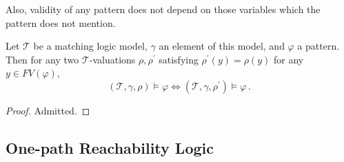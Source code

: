 \documentclass{article}
\begin{document}
Also, validity of any pattern does not depend on those variables which the pattern does not mention.
\begin{lemma}\label{lem:unusedVariables}
    Let $\mathcal{T}$ be a matching logic model, $\gamma$ an element of this model,
    and $\varphi$ a pattern.
    Then for any two $\mathcal{T}$-valuations $\rho,\rho^\prime$
    satisfying $\rho^\prime(y) = \rho(y)$ for any $y \in \mathit{FV}(\varphi)$,
    \begin{equation*}
        (\mathcal{T}, \gamma, \rho) \vDash \varphi \iff (\mathcal{T}, \gamma, \rho^\prime) \vDash \varphi \, .
    \end{equation*}
\end{lemma}
\begin{proof}
Admitted.
\end{proof}


\subsection{One-path Reachability Logic}
\end{document}
